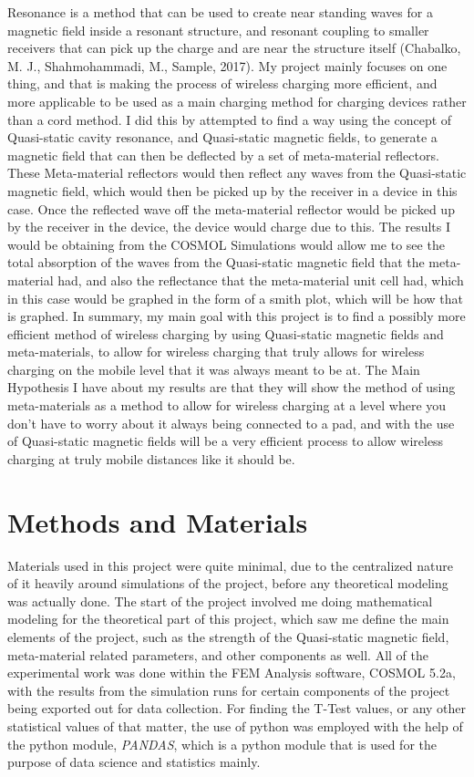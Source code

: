 \documentclass[]{article}
\begin{document}
Resonance is a method that can be used to create near standing waves for a magnetic field inside a resonant structure, and resonant coupling to smaller receivers that can pick up the charge and are near the structure itself (Chabalko, M. J., Shahmohammadi, M., Sample, 2017).
\linebreak
My project mainly focuses on one thing, and that is making the process of wireless charging more efficient, and more applicable to be used as a main charging method for charging devices rather than a cord method. I did this by attempted to find a way using the concept of Quasi-static cavity resonance, and Quasi-static magnetic fields, to generate a magnetic field that can then be deflected by a set of meta-material reflectors. These Meta-material reflectors would then reflect any waves from the Quasi-static magnetic field, which would then be picked up by the receiver in a device in this case. Once the reflected wave off the meta-material reflector would be picked up by the receiver in the device, the device would charge due to this. The results I would be obtaining from the COSMOL Simulations would allow me to see the total absorption of the waves from the Quasi-static magnetic field that the meta-material had, and also the reflectance that the meta-material unit cell had, which in this case would be graphed in the form of a smith plot, which will be how that is graphed. In summary, my main goal with this project is to find a possibly more efficient method of wireless charging by using Quasi-static magnetic fields and meta-materials, to allow for wireless charging that truly allows for wireless charging on the mobile level that it was always meant to be at. The Main Hypothesis I have about my results are that they will show the method of using meta-materials as a method to allow for wireless charging at a level where you don't have to worry about it always being connected to a pad, and with the use of Quasi-static magnetic fields will be a very efficient process to allow wireless charging at truly mobile distances like it should be.

\section{Methods and Materials} 
Materials used in this project were quite minimal, due to the centralized nature of it heavily around simulations of the project, before any theoretical modeling was actually done. The start of the project involved me doing mathematical modeling for the theoretical part of this project, which saw me define the main elements of the project, such as the strength of the Quasi-static magnetic field, meta-material related parameters, and other components as well. All of the experimental work was done within the FEM Analysis software, COSMOL 5.2a, with the results from the simulation runs for certain components of the project being exported out for data collection. For finding the T-Test values, or any other statistical values of that matter, the use of python was employed with the help of the python module, \textit{PANDAS}, which is a python module that is used for the purpose of data science and statistics mainly.
\end{document}
